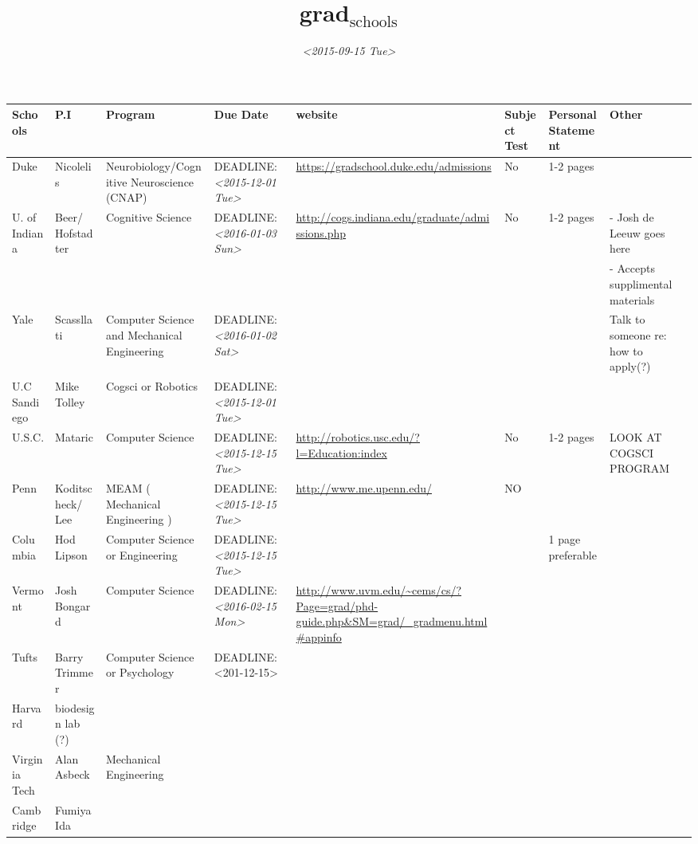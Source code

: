 \documentclass[11pt]{article}
\date{\textit{<2015-09-15 Tue>}}
\title{grad\(_{\text{schools}}\)}
\begin{document}
\maketitle
\tableofcontents

\begin{center}
\begin{tabular}{llllllll}
Schools & P.I & Program & Due Date & website & Subject Test & Personal Statement & Other\\
\hline
Duke & Nicolelis & Neurobiology/Cognitive Neuroscience (CNAP) & DEADLINE: \textit{<2015-12-01 Tue>} & \url{https://gradschool.duke.edu/admissions} & No & 1-2 pages & \\
\hline
U. of Indiana & Beer/ Hofstadter & Cognitive Science & DEADLINE: \textit{<2016-01-03 Sun>} & \url{http://cogs.indiana.edu/graduate/admissions.php} & No & 1-2 pages & - Josh de Leeuw goes here\\
 &  &  &  &  &  &  & - Accepts supplimental materials\\
\hline
Yale & Scassllati & Computer Science and Mechanical  Engineering & DEADLINE: \textit{<2016-01-02 Sat>} &  &  &  & Talk to someone re: how to apply(?)\\
\hline
U.C Sandiego & Mike Tolley & Cogsci or Robotics & DEADLINE: \textit{<2015-12-01 Tue>} &  &  &  & \\
\hline
U.S.C. & Mataric & Computer Science & DEADLINE: \textit{<2015-12-15 Tue>} & \url{http://robotics.usc.edu/?l=Education:index} & No & 1-2 pages & LOOK AT COGSCI PROGRAM\\
\hline
Penn & Koditscheck/ Lee & MEAM ( Mechanical Engineering ) & DEADLINE: \textit{<2015-12-15 Tue>} & \url{http://www.me.upenn.edu/} & NO &  & \\
\hline
Columbia & Hod Lipson & Computer Science or Engineering & DEADLINE: \textit{<2015-12-15 Tue>} &  &  & 1 page preferable & \\
\hline
Vermont & Josh Bongard & Computer Science & DEADLINE: \textit{<2016-02-15 Mon>} & \url{http://www.uvm.edu/~cems/cs/?Page=grad/phd-guide.php&SM=grad/_gradmenu.html#appinfo} &  &  & \\
\hline
Tufts & Barry Trimmer & Computer Science or Psychology & DEADLINE: <201-12-15> &  &  &  & \\
\hline
Harvard & biodesign lab (?) &  &  &  &  &  & \\
\hline
Virginia Tech & Alan Asbeck & Mechanical Engineering &  &  &  &  & \\
\hline
Cambridge & Fumiya Ida &  &  &  &  &  & \\

\end{tabular}
\end{center}
\end{document}
